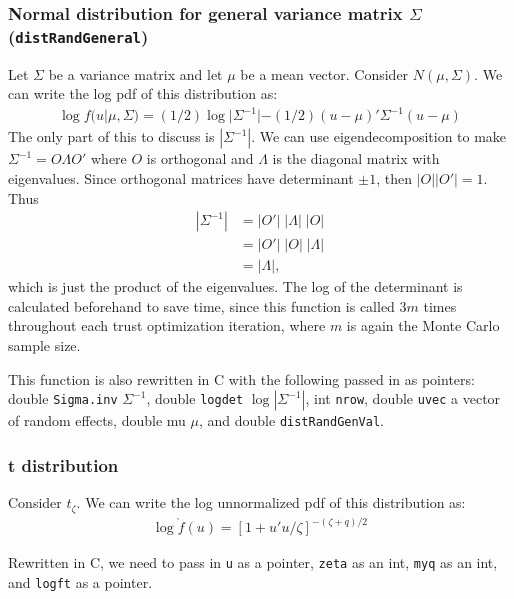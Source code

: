 \documentclass{article}
\begin{document}
\subsubsection{Normal distribution for general variance matrix $\Sigma$ (\texttt{distRandGeneral})}\label{sec:Dgeneral}
Let $\Sigma$ be a variance matrix and let $\mu$ be a mean vector. Consider $N(\mu, \Sigma)$.   We can  write the log pdf of this distribution  as:
\begin{align}
\log f (u| \mu, \Sigma) = (1/2) \log |\Sigma^{-1}| - (1/2) (u-\mu)' \Sigma^{-1} (u-\mu)
\end{align}
 The only part of this to discuss is $|\Sigma^{-1}|$. We can use eigendecomposition to make $\Sigma^{-1}=O \Lambda O'$ where $O$ is orthogonal and $\Lambda$ is the diagonal matrix with eigenvalues. Since orthogonal matrices have determinant $\pm 1$, then $|O||O'|=1$. Thus  
\begin{align}
|\Sigma^{-1}|&=|O'| \; |\Lambda| \; |O| \\
&= |O'| \; |O| \; |\Lambda| \\
&=|\Lambda|,
\end{align}
which is just the product of the eigenvalues. The log of the determinant is calculated beforehand to save time, since this function is called $3m$ times throughout each trust optimization iteration, where $m$ is again the Monte Carlo sample size.

This function is also rewritten in C with the following  passed in as pointers: double \texttt{Sigma.inv} $\Sigma^{-1}$, double \texttt{logdet} $\log |\Sigma^{-1}|$, int \texttt{nrow}, double \texttt{uvec} a vector of random effects, double {mu} $\mu$, and double \texttt{distRandGenVal}.







\subsubsection{t distribution}\label{sec:tstuff}

Consider $t_\zeta$. We can write the log unnormalized pdf of this distribution as:
\begin{align}
\log \grave{f}(u)= \left[ 1+u'u/\zeta  \right]^{-(\zeta+q)/2}
\end{align}

Rewritten in C, we need to pass in \texttt{u} as a pointer, \texttt{zeta} as an int, \texttt{myq} as an int, and \texttt{logft} as a pointer.
\end{document}
